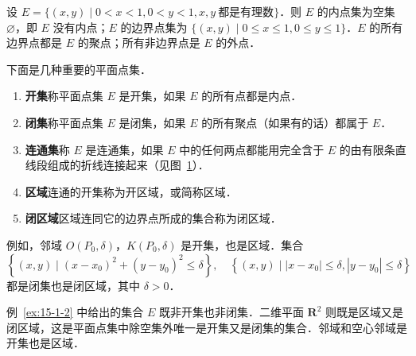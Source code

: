 \begin{example}\label{ex:15-1-2}
设 $E=\{(x,y)\mid 0<x<1,0<y<1,x,y\ \text{都是有理数}\}$．则 $E$ 的内点集为空集 $\varnothing$，即 $E$ 没有内点；$E$ 的边界点集为 $\{(x,y)\mid 0\leqslant x\leqslant 1,0\leqslant y\leqslant 1\}$．$E$ 的所有边界点都是 $E$ 的聚点；所有非边界点是 $E$ 的外点．
\end{example}

下面是几种重要的平面点集．

\begin{enumerate}[label=（\arabic*）,leftmargin=3.2em,itemsep=3pt,topsep=2pt]
\item \textbf{开集}\quad 称平面点集 $E$ 是开集，如果 $E$ 的所有点都是内点．
\item \textbf{闭集}\quad 称平面点集 $E$ 是闭集，如果 $E$ 的所有聚点（如果有的话）都属于 $E$．
\item \textbf{连通集}\quad 称 $E$ 是连通集，如果 $E$ 中的任何两点都能用完全含于 $E$ 的由有限条直线段组成的折线连接起来（见图~\ref{fig:15-6}）．
\item \textbf{区域}\quad 连通的开集称为开区域，或简称区域．
\item \textbf{闭区域}\quad 区域连同它的边界点所成的集合称为闭区域．
\end{enumerate}

\begin{figure}[htbp]
\centering
{}\caption{\relax}\label{fig:15-6}
\end{figure}

例如，邻域 $O(P_{0},\delta)$，$K(P_{0},\delta)$ 是开集，也是区域．集合
\[
\left\{(x,y)\mid \left(x-x_{0}\right)^{2}+\left(y-y_{0}\right)^{2}\leqslant\delta\right\},\quad
\left\{(x,y)\mid \left|x-x_{0}\right|\leqslant\delta,\left|y-y_{0}\right|\leqslant\delta\right\}
\]
都是闭集也是闭区域，其中 $\delta>0$．

例~\ref{ex:15-1-2} 中给出的集合 $E$ 既非开集也非闭集．二维平面 $\mathbf{R}^{2}$ 则既是区域又是闭区域，这是平面点集中除空集外唯一是开集又是闭集的集合．邻域和空心邻域是开集也是区域．

